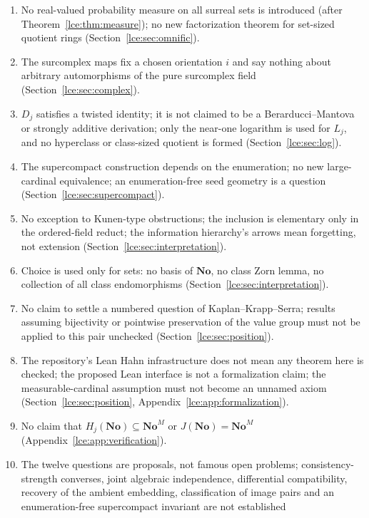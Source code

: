 \documentclass[11pt,letterpaper]{article}
\numberwithin{equation}{section}
\theoremstyle{definition}
\theoremstyle{remark}
\newcommand{\No}{\mathbf{No}}
\newcommand{\thref}[1]{Theorem~\ref{#1}}
\begin{document}
\begin{enumerate}[label=07.\arabic*]
the character theorem concerns the Hadamard product only; the mask criterion
is not a characterization in the pure ordered-field language.
\item No real-valued probability measure on all surreal sets is introduced
(after \thref{lce:thm:measure}); no new factorization theorem for set-sized
quotient rings (Section~\ref{lce:sec:omnific}).
\item The surcomplex maps fix a chosen orientation $i$ and say nothing about
arbitrary automorphisms of the pure surcomplex field
(Section~\ref{lce:sec:complex}).
\item $D_j$ satisfies a twisted identity; it is not claimed to be a
Berarducci--Mantova or strongly additive derivation; only the near-one
logarithm is used for $L_j$, and no hyperclass or class-sized quotient is
formed (Section~\ref{lce:sec:log}).
\item The supercompact construction depends on the enumeration; no new
large-cardinal equivalence; an enumeration-free seed geometry is a question
(Section~\ref{lce:sec:supercompact}).
\item No exception to Kunen-type obstructions; the inclusion is elementary
only in the ordered-field reduct; the information hierarchy's arrows mean
forgetting, not extension (Section~\ref{lce:sec:interpretation}).
\item Choice is used only for sets: no basis of $\No$, no class Zorn lemma,
no collection of all class endomorphisms (Section~\ref{lce:sec:interpretation}).
\item No claim to settle a numbered question of Kaplan--Krapp--Serra; results
assuming bijectivity or pointwise preservation of the value group must not be
applied to this pair unchecked (Section~\ref{lce:sec:position}).
\item The repository's Lean Hahn infrastructure does not mean any theorem
here is checked; the proposed Lean interface is not a formalization claim;
the measurable-cardinal assumption must not become an unnamed axiom
(Section~\ref{lce:sec:position}, Appendix~\ref{lce:app:formalization}).
\item No claim that $H_j(\No)\subseteq\No^M$ or $J(\No)=\No^M$
(Appendix~\ref{lce:app:verification}).
\item The twelve questions are proposals, not famous open problems;
consistency-strength converses, joint algebraic independence, differential
compatibility, recovery of the ambient embedding, classification of image
pairs and an enumeration-free supercompact invariant are not established

\end{enumerate}
\end{document}
